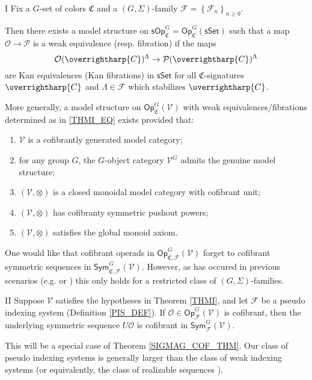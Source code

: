 \documentclass[a4paper,10pt
,draft
]{article}%
\numberwithin{equation}{section}
\numberwithin{figure}{section}
\theoremstyle{definition} %
\newcommand{\set}[1]{\left\{#1\right\}}%
\newcommand{\vect}[1]{\text{\overrightharp{\ensuremath{#1}}}}
\newcommand{\Sym}{\ensuremath{\mathsf{Sym}}}%
\newcommand{\Op}{\mathsf{Op}}%
\newcommand{\F}{\ensuremath{\mathcal F}}
\newcommand{\V}{\ensuremath{\mathcal V}}
\renewcommand{\O}{\ensuremath{\mathcal O}}
\newcommand{\1}{\ensuremath{\mathbbm 1}}%
\begin{document}
 


\begin{customthm}{I}
      \label{THMI}
Fix a $G$-set of colors $\mathfrak{C}$
and a $(G,\Sigma)$-family $\F = \set{\F_n}_{n \geq 0}$.

Then there exists a model structure on
$\mathsf{sOp}^G_{\mathfrak{C}} = 
\mathsf{Op}^G_{\mathfrak{C}}(\mathsf{sSet})$
such that a map
$\mathcal{O} \to \mathcal{P}$
is a weak equivalence (resp. fibration) if the maps
\begin{equation}\label{THMI_EQ}
	\O(\vect{C})^{\Lambda} \to \mathcal{P}(\vect{C})^{\Lambda}
\end{equation}
are Kan equivalences (Kan fibrations)
in $\mathsf{sSet}$
for all $\mathfrak{C}$-signatures $\vect{C}$
and $\Lambda \in \F$ which stabilizes $\vect{C}$.

More generally, a model structure on 
$\Op^G_{\mathfrak C}(\V)$
with weak equivalences/fibrations determined as in 
\eqref{THMI_EQ}
exists provided that:
\begin{enumerate}[label = (\roman*)]
	\item $\V$ is a cofibrantly generated model category;
	\item for any group $G$, the $G$-object category $\V^G$ admits the genuine model structure;
	\item $(\V, \otimes)$ is a closed monoidal model category with cofibrant unit;
	\item $(\V, \otimes)$ has cofibranty symmetric pushout powers;
	\item $(\V, \otimes)$ satisfies the global monoid axiom.
\end{enumerate}
\end{customthm}

One would like that cofibrant operads in $\Op^G_{\mathfrak C, \F}(\V)$ forget to cofibrant symmetric sequences in $\Sym^G_{\mathfrak C, \F}(\V)$.
However, as has occured in previous scenarios
(e.g. \cite[{Remark 6.64}]{BP_geo} or \cite[Prop. 4.10]{GW18})
this only holds for a restricted class of $(G,\Sigma)$-families.
\begin{customthm}{II}\label{THMII}
	Suppose $\V$ satisfies the hypotheses in Theorem \ref{THMI},
	and let $\F$ be a pseudo indexing system (Definition \ref{PIS_DEF}).
	If $\O \in \Op^G_\F(\V)$ is cofibrant, then the underlying symmetric sequence $U\O$ is cofibrant in $\Sym^G_\F(\V)$.
\end{customthm}
This will be a special case of Theorem \ref{SIGMAG_COF_THM}.
Our class of pseudo indexing systems is generally larger than
the class of weak indexing systems \cite[Defn. 4.49]{BP_geo}
(or equivalently, the class of realizable sequences \cite[Defn. 4.6]{GW18}).
\end{document}
